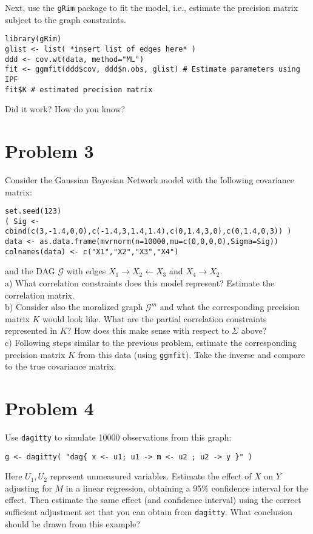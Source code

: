\documentclass[letterpaper]{article}
\begin{document}
\noindent Next, use the \texttt{gRim} package to fit the model, i.e., estimate the precision matrix subject to the graph constraints.
\begin{verbatim}
library(gRim)
glist <- list( *insert list of edges here* )
ddd <- cov.wt(data, method="ML")
fit <- ggmfit(ddd$cov, ddd$n.obs, glist) # Estimate parameters using IPF
fit$K # estimated precision matrix
\end{verbatim}

\noindent Did it work? How do you know?

\section*{Problem 3}

Consider the Gaussian Bayesian Network model with the following covariance matrix:
\begin{verbatim}
set.seed(123)
( Sig <- cbind(c(3,-1.4,0,0),c(-1.4,3,1.4,1.4),c(0,1.4,3,0),c(0,1.4,0,3)) )
data <- as.data.frame(mvrnorm(n=10000,mu=c(0,0,0,0),Sigma=Sig))
colnames(data) <- c("X1","X2","X3","X4")
\end{verbatim}
and the DAG $\mathcal{G}$ with edges $X_1 \rightarrow X_2 \leftarrow X_3$ and $X_4 \rightarrow X_2$.\\

\noindent a) What correlation constraints does this model represent? Estimate the correlation matrix.\\

\noindent b) Consider also the moralized graph $\mathcal{G}^m$ and what the corresponding precision matrix $K$ would look like. What are the partial correlation constraints represented in $K$? How does this make sense with respect to $\Sigma$ above? \\

\noindent c) Following steps similar to the previous problem, estimate the corresponding precision matrix $K$ from this data (using \texttt{ggmfit}). Take the inverse and compare to the true covariance matrix.

\section*{Problem 4}

Use \texttt{dagitty} to simulate 10000 observations from this graph:
\begin{verbatim}
g <- dagitty( "dag{ x <- u1; u1 -> m <- u2 ; u2 -> y }" )
\end{verbatim}
Here $U_1,U_2$ represent unmeasured variables. Estimate the effect of $X$ on $Y$ adjusting for $M$ in a linear regression, obtaining a 95\% confidence interval for the effect. Then estimate the same effect (and confidence interval) using the correct sufficient adjustment set that you can obtain from \texttt{dagitty}. What conclusion should be drawn from this example?
\end{document}
